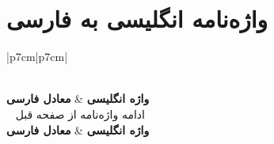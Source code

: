 \chapter*{واژه‌نامه انگلیسی به فارسی}
\pagestyle{style9}

\begin{longtable}{|p{7cm}|p{7cm}|}
\caption[]{واژه‌نامه انگلیسی به فارسی}\\
\hline
\textbf{واژه انگلیسی} & \textbf{معادل فارسی} \\
\hline
\endfirsthead
{}%
{{\tablename\ \thetable{}   ادامه واژه‌نامه از صفحه قبل}} \\
\hline
\textbf{واژه انگلیسی} & \textbf{معادل فارسی} \\
\hline
\endhead
\hline {} \\ 
\endfoot
\hline
\endlastfoot


\end{longtable}
